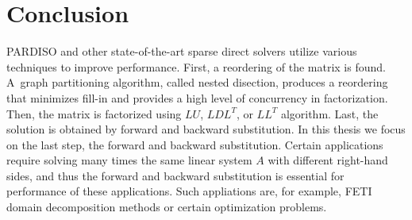 \chapter{Conclusion}
\label{sec:conclusion}

PARDISO and other state-of-the-art sparse direct solvers utilize various techniques to improve performance. First, a reordering of the matrix is found. A~graph partitioning algorithm, called nested disection, produces a reordering that minimizes fill-in and provides a high level of concurrency in factorization. Then, the matrix is factorized using $LU$, $LDL^T$, or $LL^T$ algorithm. Last, the solution is obtained by forward and backward substitution. In this thesis we focus on the last step, the forward and backward substitution. Certain applications require solving many times the same linear system $A$ with different right-hand sides, and thus the forward and backward substitution is essential for performance of these applications. Such appliations are, for example, FETI domain decomposition methods or certain optimization problems.

